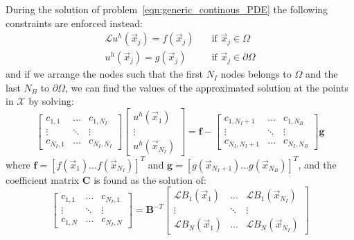 During the solution of problem~\eqref{eqn:generic_continous_PDE} the following constraints are enforced instead:
\begin{equation}
	\begin{aligned}
		\mathcal{L} u^h(\vec{x}_j) = f(\vec{x}_j) \quad & \text{if $\vec{x}_j \in \Omega$}  \\
		u^h(\vec{x}_j) = g(\vec{x}_j) 						    \quad & \text{if $\vec{x}_j \in \partial\Omega$}
	\end{aligned}
\end{equation}
and if we arrange the nodes such that the first $N_I$ nodes belongs to $\Omega$ and the last $N_B$ to $\partial\Omega$, we can find the values of the approximated solution at the points in $\mathcal{X}$ by solving:
\begin{equation}
	\begin{bmatrix}
		c_{1,1} 		& 	\dots 		& c_{1,N_I}  \\
		\vdots			& \ddots	& \vdots		\\
		c_{N_I,1} & \dots		& c_{N_I,N_I}
	\end{bmatrix}
	\begin{bmatrix}
		u^h(\vec{x}_1)  \\
		\vdots					\\
		u^h(\vec{x}_{N_I})
	\end{bmatrix}
	=
	\boldsymbol{f} -
	\begin{bmatrix}
		c_{1,N_I+1} 		& 	\dots 		& c_{1,N_B}  \\
		\vdots			& \ddots	& \vdots		\\
		c_{N_I,N_I+1} & \dots		& c_{N_I,N_B}
	\end{bmatrix}
	\boldsymbol{g}
\end{equation}
where $\boldsymbol{f} = [f(\vec{x}_1) \dots f(\vec{x}_{N_I})]^T$ and $\boldsymbol{g} = [g(\vec{x}_{N_I+1}) \dots g(\vec{x}_{N_B})]^T$, and the coefficient matrix $\boldsymbol{C}$ is found as the solution of:
\begin{equation}
	\label{eqn:generic_discretized_PDE_by_MMs}
	\begin{bmatrix}
		c_{1,1} 		& 	\dots 		& c_{N_I,1}  \\
		\vdots			& \ddots	& \vdots		\\
		c_{1,N} & \dots		& c_{N_I,N}
	\end{bmatrix}
	=
	\boldsymbol{B}^{-T}
	\begin{bmatrix}
		\mathcal{L} B_1(\vec{x}_1)  & \dots		& \mathcal{L} B_1(\vec{x}_{N_I})     \\
		\vdots												& \ddots  & \vdots					      								  \\
		\mathcal{L} B_N(\vec{x}_1)  & \dots		& \mathcal{L} B_N(\vec{x}_{N_I})
	\end{bmatrix}
\end{equation}
